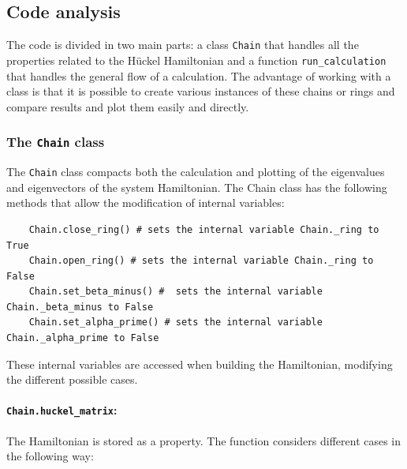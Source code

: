 \documentclass[twocolumn]{article}
\begin{document}
\subsection{Code analysis}
The code is divided in two main parts: a class \texttt{Chain} that handles all the properties related to the Hückel Hamiltonian and a function \texttt{run\_calculation} that handles the general flow of a calculation. The advantage of working with a class is that it is possible to create various instances of these chains or rings and compare results and plot them easily and directly. 

\subsubsection{The \texttt{Chain} class}
The \texttt{Chain} class compacts both the calculation and plotting of the eigenvalues and eigenvectors of the system Hamiltonian. The Chain class has the following methods that allow the modification of internal variables:
\begin{lstlisting}
    Chain.close_ring() # sets the internal variable Chain._ring to True
    Chain.open_ring() # sets the internal variable Chain._ring to False
    Chain.set_beta_minus() #  sets the internal variable Chain._beta_minus to False
    Chain.set_alpha_prime() # sets the internal variable Chain._alpha_prime to False
\end{lstlisting} 
These internal variables are accessed when building the Hamiltonian, modifying the different possible cases. 

\paragraph{\texttt{Chain.huckel\_matrix}:}
The Hamiltonian is stored as a property. The function considers different cases in the following way:
\end{document}
